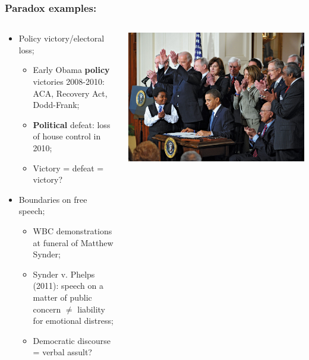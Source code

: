 \documentclass[aspectratio=169]{beamer}
\theoremstyle{principle}
\begin{document}
\begin{frame}
\frametitle{Paradox examples:}
\begin{columns}
\begin{column}{0.5\textwidth}
\begin{itemize}
\item Policy victory/electoral loss;
\begin{itemize}
\item Early Obama \textbf{policy} victories 2008-2010: ACA, Recovery Act, Dodd-Frank;
\item \textbf{Political} defeat: loss of house control in 2010;
\item Victory = defeat = victory?
\end{itemize}
\bigskip
\item Boundaries on free speech;
\begin{itemize}
\item WBC demonstrations at funeral of Matthew Synder;
\item Synder v. Phelps (2011): speech on a matter of public concern $\neq$ liability for emotional distress;
\item Democratic discourse = verbal assult?
\end{itemize}
\end{itemize}
\end{column}
\begin{column}{0.5\textwidth}
\begin{center}
\includegraphics[scale=0.075]{ACA_signing.jpg}

\end{center}
\end{column}
\end{columns}
\end{frame}
\end{document}
